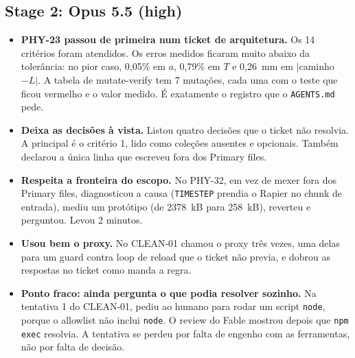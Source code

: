 \documentclass[11pt,a4paper]{article}
\newcommand{\tk}[1]{\texttt{#1}}
\begin{document}
\subsection*{Stage 2: Opus 5.5 (high)}
\begin{itemize}
  \item \textbf{PHY-23 passou de primeira num ticket de arquitetura.} Os 14 critérios foram atendidos.
  Os erros medidos ficaram muito abaixo da tolerância: no pior caso, 0{,}05\% em $a$, 0{,}79\% em $T$ e 0{,}26~mm em $|$caminho$-L|$.
  A tabela de mutate-verify tem 7 mutações, cada uma com o teste que ficou vermelho e o valor medido. É exatamente o registro que o \tk{AGENTS.md} pede.
  \item \textbf{Deixa as decisões à vista.} Listou quatro decisões que o ticket não resolvia. A principal é o critério 1, lido como coleções ausentes e opcionais. Também declarou a única linha que escreveu fora dos Primary files.
  \item \textbf{Respeita a fronteira do escopo.} No PHY-32, em vez de mexer fora dos Primary files, diagnosticou a causa (\tk{TIMESTEP} prendia o Rapier no chunk de entrada), mediu um protótipo (de 2378~kB para 258~kB), reverteu e perguntou. Levou 2 minutos.
  \item \textbf{Usou bem o proxy.} No CLEAN-01 chamou o proxy três vezes, uma delas para um guard contra loop de reload que o ticket não previa, e dobrou as respostas no ticket como manda a regra.
  \item \textbf{Ponto fraco: ainda pergunta o que podia resolver sozinho.} Na tentativa 1 do CLEAN-01, pediu ao humano para rodar um script \tk{node}, porque o allowlist não inclui \tk{node}. O review do Fable mostrou depois que \tk{npm exec} resolvia. A tentativa se perdeu por falta de engenho com as ferramentas, não por falta de decisão.
\end{itemize}
\end{document}
